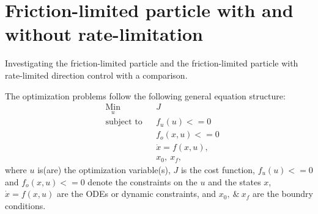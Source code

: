 \chapter[Particle model optimization]{Friction-limited particle with and without rate-limitation}
Investigating the friction-limited particle and the friction-limited particle with rate-limited direction control with a comparison. 

The optimization problems follow the following general equation structure: 
\begin{align}
    & \underset{u}{\text{Min}}
    & & J\\
%
    & \text{subject to} 
    & & f_u(u) <= 0\\
%
    &&& f_o(x,u) <= 0 \\
%
    &&& \dot x = f(x,u),\\
%
    &&& x_0,\ x_f,
\end{align}
where $u$ is(are) the optimization variable(s), $J$ is the cost function, $f_u(u) <= 0$ and $f_o(x,u) <= 0$ denote the constraints on the $u$ and the states $x$, $\dot x = f(x,u)$ are the ODEs or dynamic constraints, and $x_0,\ \&\ x_f$ are the boundry conditions. 

